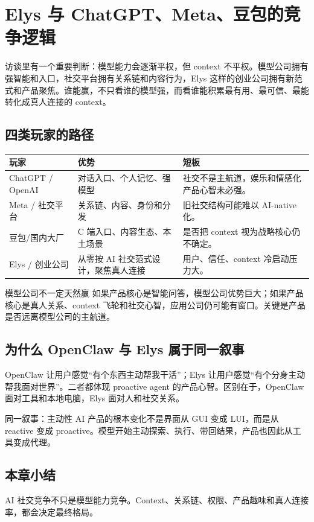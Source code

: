 \section{Elys 与 ChatGPT、Meta、豆包的竞争逻辑}

访谈里有一个重要判断：模型能力会逐渐平权，但 context 不平权。模型公司拥有强智能和入口，社交平台拥有关系链和内容行为，Elys 这样的创业公司拥有新范式和产品聚焦。谁能赢，不只看谁的模型强，而看谁能积累最有用、最可信、最能转化成真人连接的 context。

\subsection{四类玩家的路径}

\noindent\begin{longtable}{p{}p{}p{}}
\toprule
玩家 & 优势 & 短板 \\
\midrule
ChatGPT / OpenAI & 对话入口、个人记忆、强模型 & 社交不是主航道，娱乐和情感化产品心智未必强。 \\
Meta / 社交平台 & 关系链、内容、身份和分发 & 旧社交结构可能难以 AI-native 化。 \\
豆包/国内大厂 & C 端入口、内容生态、本土场景 & 是否把 context 视为战略核心仍不确定。 \\
Elys / 创业公司 & 从零按 AI 社交范式设计，聚焦真人连接 & 用户、信任、context 冷启动压力大。 \\
\bottomrule
\end{longtable}

\begin{warningbox}{模型公司不一定天然赢}
如果产品核心是智能问答，模型公司优势巨大；如果产品核心是真人关系、context 飞轮和社交心智，应用公司仍可能有窗口。关键是产品是否远离模型公司的主航道。
\end{warningbox}

\subsection{为什么 OpenClaw 与 Elys 属于同一叙事}

OpenClaw 让用户感觉“有个东西主动帮我干活”；Elys 让用户感觉“有个分身主动帮我面对世界”。二者都体现 proactive agent 的产品心智。区别在于，OpenClaw 面对工具和本地电脑，Elys 面对人和社交关系。

\begin{importantbox}{同一叙事：主动性}
AI 产品的根本变化不是界面从 GUI 变成 LUI，而是从 reactive 变成 proactive。模型开始主动探索、执行、带回结果，产品也因此从工具变成代理。
\end{importantbox}

\subsection{本章小结}

AI 社交竞争不只是模型能力竞争。Context、关系链、权限、产品趣味和真人连接率，都会决定最终格局。

